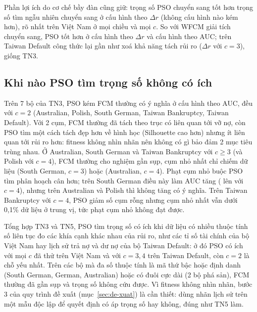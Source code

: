 Phần lợi ích do cơ chế bầy đàn cũng giữ: trọng số PSO chuyển sang tốt hơn trọng số tìm ngẫu nhiên chuyển sang ở
\soLieuEMuoiChenhTiLeNgauNhienChuyenHon{} cấu hình theo $\Delta r$ (không cấu hình nào kém hơn), rõ nhất trên Việt Nam ở mọi
chiều và mọi $c$. So với WFCM giải tích chuyển sang, PSO tốt hơn ở \soLieuEMuoiChenhTiLeWfcmChuyenHon{} cấu hình theo $\Delta r$
và \soLieuEMuoiAucCungWfcmChuyenHon{} cấu hình theo AUC; trên Taiwan Default công thức lại gần như xoá khả năng tách rủi ro
($\Delta r$ \soLieuEMuoiTaiwanTkKcCBaWfcmChuyenChenhTiLe{} với $c = 3$), giống TN3.

\subsection{Khi nào PSO tìm trọng số không có ích}
\label{sec:khong-co-ich}

Trên 7 bộ của TN3, PSO kém FCM thường có ý nghĩa ở \soLieuETamAucCungFcmKppKem{} cấu hình theo AUC, đều với
$c = 2$ (Australian, Polish, South German, Taiwan Bankruptcy, Taiwan Default). Với 2 cụm, FCM thường đã tách theo trục có
liên quan tới vỡ nợ, còn PSO tìm một cách tách đẹp hơn về hình học (Silhouette cao hơn) nhưng ít liên quan tới rủi ro hơn:
fitness không nhìn nhãn nên không có gì bảo đảm 2 mục tiêu trùng nhau. Ở Australian, South German và Taiwan Bankruptcy với
$c \ge 3$ (và Polish với $c = 4$), FCM thường cho nghiệm gần sụp, cụm nhỏ nhất chỉ chiếm \soLieuETamSouthGermanCBaFcmKppCumNhoNhat{} dữ liệu (South
German, $c = 3$) hoặc \soLieuETamAustralianCBonFcmKppCumNhoNhat{} (Australian, $c = 4$). Phạt cụm nhỏ buộc PSO tìm phân hoạch
cân hơn; trên South German điều này làm AUC tăng (\soLieuETamSouthGermanCBonFcmKppAucCung{} lên
\soLieuETamSouthGermanCBonPsoTrongSoAucCung{} với $c = 4$), nhưng trên Australian và Polish thì không tăng có ý nghĩa. Trên
Taiwan Bankruptcy với $c = 4$, PSO giảm số cụm rỗng nhưng cụm nhỏ nhất vẫn dưới 0,1\% dữ liệu ở trung vị, tức phạt cụm nhỏ
không đạt được.

Tổng hợp TN3 và TN5, PSO tìm trọng số có ích khi dữ liệu có nhiều thuộc tính số liên tục đo các khía cạnh khác nhau của
rủi ro, như các tỉ số tài chính của bộ Việt Nam hay lịch sử trả nợ và dư nợ của bộ Taiwan Default: ở đó PSO có ích với mọi
$c$ đã thử trên Việt Nam và với $c = 3, 4$ trên Taiwan Default, còn $c = 2$ là chỗ yếu nhất. Trên các bộ mà đa số thuộc tính là mã thứ bậc hoặc định danh (South German,
German, Australian) hoặc có đuôi cực dài (2 bộ phá sản), FCM thường đã gần sụp và trọng số không cứu được. Vì fitness không
nhìn nhãn, bước 3 của quy trình đề xuất (mục~\ref{sec:de-xuat}) là cần thiết: dùng nhãn lịch sử trên một mẫu độc lập để quyết
định có áp trọng số hay không, đúng như TN5 làm.


